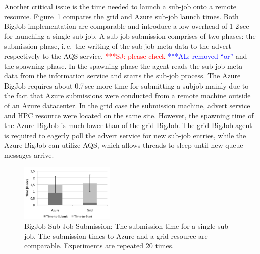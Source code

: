 \documentclass[conference,final]{IEEEtran}
\newcommand{\alnote}[1]{ {\textcolor{blue} { ***AL: #1 }}}
\newcommand{\jhanote}[1]{ {\textcolor{red} { ***SJ: #1 }}}
\newcommand{\alnote}[1]{}
\newcommand{\jhanote}[1]{}
\begin{document}
Another critical issue is the time needed to launch a sub-job onto a
remote resource. Figure~\ref{fig:performance_startup} compares the
grid and Azure sub-job launch times. Both BigJob implementation are
comparable and introduce a low overhead of 1-2\,sec for launching a
single sub-job.
A sub-job submission comprises of two phases: the submission phase,
i.\,e.\ the writing of the sub-job meta-data to the advert
respectively to the AQS service, \jhanote{please check}
\alnote{removed ``or''} and the
spawning phase. In the spawning phase the agent reads the sub-job
meta-data from the information service and starts the sub-job
process. The Azure BigJob requires about 0.7\,sec more time for
submitting a subjob mainly due to the fact that Azure submissions were
conducted from a remote machine outside of an Azure datacenter. In the
grid case the submission machine, advert service and HPC resource were
located on the same site.  However, the spawning time of the Azure
BigJob is much lower than of the grid BigJob. The grid BigJob agent is
required to eagerly poll the advert service for new sub-job entries,
while the Azure BigJob can utilize AQS, which allows threads to sleep
until new queue messages arrive.
\begin{figure}[htbp]
    \centering
        \includegraphics[width=0.4\textwidth]{performance/startup.pdf}
        \caption{BigJob Sub-Job Submission: The submission time for
          a single sub-job. The submission times to Azure and a grid
          resource are comparable. Experiments are repeated 20 times.
          }
    \label{fig:performance_startup}
\end{figure}
\end{document}
